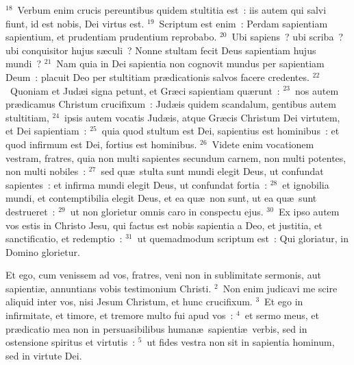 ${}^{18}$~Verbum enim crucis pereuntibus quidem stultitia est~: iis autem qui salvi fiunt, id est nobis, Dei virtus est.
${}^{19}$~Scriptum est enim~: Perdam sapientiam sapientium, et prudentiam prudentium reprobabo.
${}^{20}$~Ubi sapiens~? ubi scriba~? ubi conquisitor hujus s\ae culi~? Nonne stultam fecit Deus sapientiam hujus mundi~?
${}^{21}$~Nam quia in Dei sapientia non cognovit mundus per sapientiam Deum~: placuit Deo per stultitiam pr\ae dicationis salvos facere credentes.
${}^{22}$~Quoniam et Jud\ae i signa petunt, et Gr\ae ci sapientiam qu\ae runt~:
${}^{23}$~nos autem pr\ae dicamus Christum crucifixum~: Jud\ae is quidem scandalum, gentibus autem stultitiam,
${}^{24}$~ipsis autem vocatis Jud\ae is, atque Gr\ae cis Christum Dei virtutem, et Dei sapientiam~:
${}^{25}$~quia quod stultum est Dei, sapientius est hominibus~: et quod infirmum est Dei, fortius est hominibus.
${}^{26}$~Videte enim vocationem vestram, fratres, quia non multi sapientes secundum carnem, non multi potentes, non multi nobiles~:
${}^{27}$~sed qu\ae\ stulta sunt mundi elegit Deus, ut confundat sapientes~: et infirma mundi elegit Deus, ut confundat fortia~:
${}^{28}$~et ignobilia mundi, et contemptibilia elegit Deus, et ea qu\ae\ non sunt, ut ea qu\ae\ sunt destrueret~:
${}^{29}$~ut non glorietur omnis caro in conspectu ejus.
${}^{30}$~Ex ipso autem vos estis in Christo Jesu, qui factus est nobis sapientia a Deo, et justitia, et sanctificatio, et redemptio~:
${}^{31}$~ut quemadmodum scriptum est~: Qui gloriatur, in Domino glorietur.

\lettrine[lines=10,image=true,loversize=0.05,lraise=-0.03]{E}{}t ego, cum venissem ad vos, fratres, veni non in sublimitate sermonis, aut sapienti\ae , annuntians vobis testimonium Christi.
${}^{2}$~Non enim judicavi me scire aliquid inter vos, nisi Jesum Christum, et hunc crucifixum.
${}^{3}$~Et ego in infirmitate, et timore, et tremore multo fui apud vos~:
${}^{4}$~et sermo meus, et pr\ae dicatio mea non in persuasibilibus human\ae\ sapienti\ae\ verbis, sed in ostensione spiritus et virtutis~:
${}^{5}$~ut fides vestra non sit in sapientia hominum, sed in virtute Dei.


